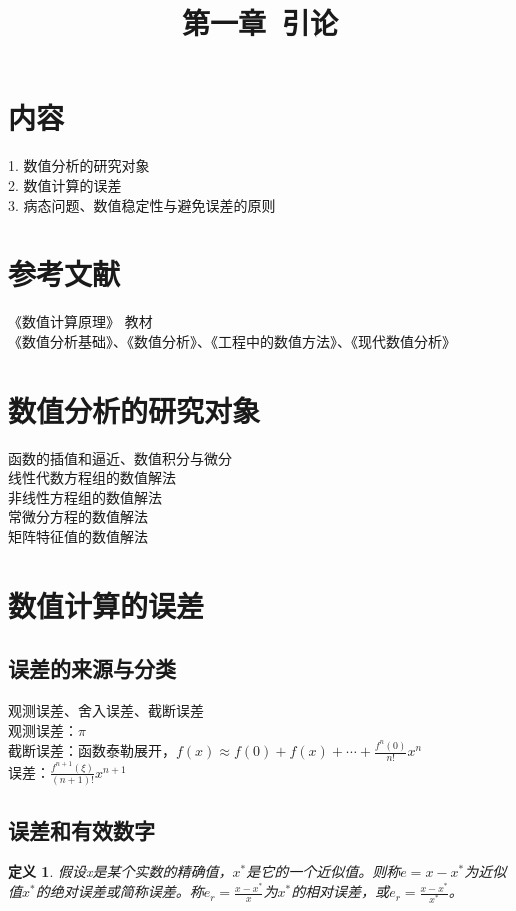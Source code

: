 \documentclass[a4paper]{article}
\title{第一章\ 引论}
\newtheorem{definition}{定义}[section]
\begin{document}
\maketitle
\section{内容}
1. 数值分析的研究对象 \\
2. 数值计算的误差 \\
3. 病态问题、数值稳定性与避免误差的原则 \\

\section{参考文献}
《数值计算原理》  教材 \\
《数值分析基础》、《数值分析》、《工程中的数值方法》、《现代数值分析》

\section{数值分析的研究对象}
函数的插值和逼近、数值积分与微分 \\
线性代数方程组的数值解法 \\
非线性方程组的数值解法 \\
常微分方程的数值解法 \\
矩阵特征值的数值解法 \\

\section{数值计算的误差}
\subsection{误差的来源与分类}
观测误差、舍入误差、截断误差 \\
观测误差：$\pi$ \\
截断误差：函数泰勒展开，$f(x) \approx f(0) + f(x) + \cdots + \frac{f^n(0)}{n!}x^n$ \\
误差：$\frac{f^{n+1}(\xi)}{(n+1)!}x^{n+1}$

\subsection{误差和有效数字}
\begin{definition}
假设x是某个实数的精确值，$x^*$是它的一个近似值。则称$e=x-x^*$为近似值$x^*$的绝对误差或简称误差。称$e_r=\frac{x-x^*}{x}$为$x^*$的相对误差，或$e_r=\frac{x-x^*}{x^*}$。
\end{definition}
\end{document}

